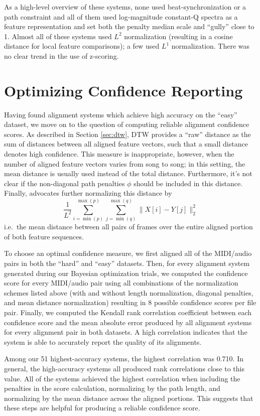 \documentclass{article}
\begin{document}
As a high-level overview of these systems, none used beat-synchronization or a path constraint and all of them used log-magnitude constant-Q spectra as a feature representation and set both the penalty median scale and ``gully'' close to 1.
Almost all of these systems used $L^2$ normalization (resulting in a cosine distance for local feature comparisons); a few used $L^1$ normalization.
There was no clear trend in the use of z-scoring.

\section{Optimizing Confidence Reporting}
\label{sec:confidence}

Having found alignment systems which achieve high accuracy on the ``easy'' dataset, we move on to  the question of computing reliable alignment confidence scores.
As described in Section \ref{sec:dtw}, DTW provides a ``raw'' distance as the sum of distances between all aligned feature vectors, such that a small distance denotes high confidence.
This measure is inappropriate, however, when the number of aligned feature vectors varies from song to song; in this setting, the mean distance is usually used instead of the total distance.
Furthermore, it's not  clear if the non-diagonal path penalties $\phi$ should be included in this distance.
Finally, \cite{raffel2015large} advocates further normalizing this distance by
$$
\frac{1}{L^2} \sum_{i = \min(p)}^{\max(p)} \sum_{j = \min(q)}^{\max(q)} \|X[i] - Y[j]\|_2^2
$$
i.e.\ the mean distance between all pairs of frames over the entire aligned portion of both feature sequences.

To choose an optimal confidence measure, we first aligned all of the MIDI/audio pairs in both the ``hard'' and ``easy'' datasets.
Then, for every alignment system generated during our Bayesian optimization trials, we computed the confidence score for every MIDI/audio pair using all combinations of the normalization schemes listed above (with and without length normalization, diagonal penalties, and mean distance normalization) resulting in 8 possible confidence scores per file pair.
Finally, we computed the Kendall rank correlation coefficient \cite{kendall1938new} between each confidence score and the mean absolute error produced by all alignment systems for every alignment pair in both datasets.
A high correlation indicates that the system is able to accurately report the quality of its alignments.

Among our 51 highest-accuracy systems, the highest correlation was 0.710.
In general, the high-accuracy systems all produced rank correlations close to this value.
All of the systems achieved the highest correlation when including the penalties in the score calculation, normalizing by the path length, and normalizing by the mean distance across the aligned portions.
This suggests that these steps are helpful for producing a reliable confidence score.
\end{document}
